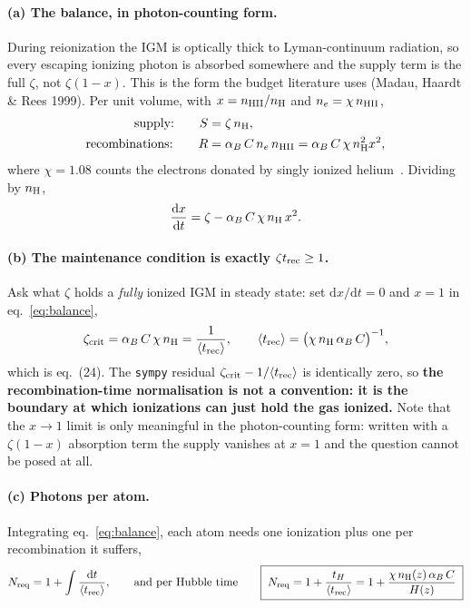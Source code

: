 \documentclass[11pt,a4paper]{article}
\begin{document}
\paragraph{(a) The balance, in photon-counting form.}
During reionization the IGM is optically thick to Lyman-continuum radiation, so
every escaping ionizing photon is absorbed somewhere and the supply term is the
full $\zeta$, not $\zeta(1-x)$. This is the form the budget literature uses
(Madau, Haardt \& Rees 1999). Per unit volume, with $x = n_{\rm HII}/n_{\rm H}$
and $n_e = \chi\,n_{\rm HII}$,
\begin{align}
  \text{supply:}\qquad        S &= \zeta\,n_{\rm H}, \\
  \text{recombinations:}\qquad R &= \alpha_B\,C\,n_e\,n_{\rm HII}
                                  = \alpha_B\,C\,\chi\,n_{\rm H}^2 x^2 ,
\end{align}
where $\chi = 1.08$ counts the electrons donated by singly ionized
helium~\cite{md14}. Dividing by $n_{\rm H}$,
\begin{equation}
  \frac{\mathrm{d}x}{\mathrm{d}t}
    = \zeta - \alpha_B\,C\,\chi\,n_{\rm H}\,x^2 .
  \label{eq:balance}
\end{equation}

\paragraph{(b) The maintenance condition is exactly
            \texorpdfstring{$\zeta t_{\rm rec}\ge1$}{zeta t_rec >= 1}.}
Ask what $\zeta$ holds a \emph{fully} ionized IGM in steady state: set
$\mathrm{d}x/\mathrm{d}t = 0$ and $x=1$ in eq.~\eqref{eq:balance},
\begin{equation}
  \zeta_{\rm crit} = \alpha_B\,C\,\chi\,n_{\rm H}
                   = \frac{1}{\langle t_{\rm rec}\rangle},
  \qquad
  \langle t_{\rm rec}\rangle
   = \bigl(\chi\,n_{\rm H}\,\alpha_B\,C\bigr)^{-1},
  \label{eq:zetacrit}
\end{equation}
which is \cite{md14} eq.~(24). The \texttt{sympy} residual
$\zeta_{\rm crit} - 1/\langle t_{\rm rec}\rangle$ is identically zero, so
\textbf{the recombination-time normalisation is not a convention: it is the
boundary at which ionizations can just hold the gas ionized.} Note that the
$x\to1$ limit is only meaningful in the photon-counting form: written with a
$\zeta(1-x)$ absorption term the supply vanishes at $x=1$ and the question
cannot be posed at all.

\paragraph{(c) Photons per atom.} Integrating eq.~\eqref{eq:balance}, each atom
needs one ionization plus one per recombination it suffers,
\begin{equation}
  N_{\rm req} = 1 + \int \frac{\mathrm{d}t}{\langle t_{\rm rec}\rangle} ,
  \qquad\text{and per Hubble time}\qquad
  \boxed{\;N_{\rm req} = 1 + \frac{t_H}{\langle t_{\rm rec}\rangle}
        = 1 + \frac{\chi\,n_{\rm H}(z)\,\alpha_B\,C}{H(z)}\;}
  \label{eq:Nreq}
\end{equation}
\end{document}
